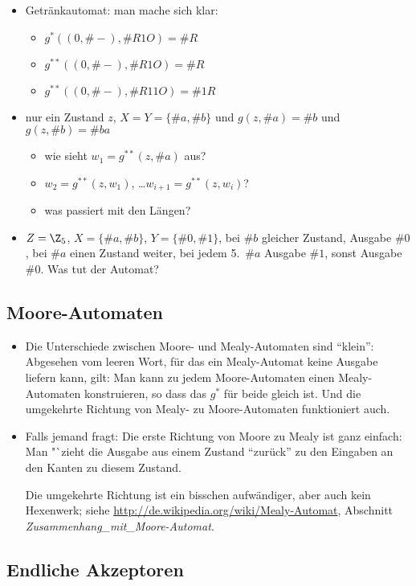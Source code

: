 \documentclass[12pt]{article}
\theoremstyle{margin}
\theoremstyle{margin}
\begin{document}
  \begin{itemize}
  \item Getränkautomat: man mache sich klar:
    \begin{itemize}
    \item $g^*((0,\#-), \#{R1O})= \#R$
    \item $g^{**}((0,\#-), \#{R1O})= \#R$
    \item $g^{**}((0,\#-), \#{R11O})= \#{1R}$
    \end{itemize}
  \item nur ein Zustand $z$, $X=Y=\{\#a,\#b\}$
    und $g(z,\#a)=\#{b}$ und $g(z,\#b)=\#{ba}$
    \begin{itemize}
    \item wie sieht $w_1=g^{**}(z,\#a)$ aus?
    \item $w_2=g^{**}(z,w_1)$, \dots $w_{i+1}=g^{**}(z,w_i)$?
    \item was passiert mit den Längen?
    \end{itemize}
  \item $Z=\Z_5$, $X=\{\#a,\#b\}$, $Y=\{\#0,\#1\}$, bei $\#b$ gleicher
    Zustand, Ausgabe $\#0$, bei $\#a$ einen Zustand weiter, bei jedem
    5.~$\#a$ Ausgabe $\#1$, sonst Ausgabe $\#0$. Was tut der Automat?
  \end{itemize}
\subsection{Moore-Automaten}
  \begin{itemize}
  \item Die Unterschiede zwischen Moore- und Mealy-Automaten sind
    "`klein"': Abgesehen vom leeren Wort, für das ein Mealy-Automat
    keine Ausgabe liefern kann, gilt: Man kann zu jedem
    Moore-Automaten einen Mealy-Automaten konstruieren, so dass das
    $g^*$ für beide gleich ist. Und die umgekehrte Richtung von Mealy-
    zu Moore-Automaten funktioniert auch.

  \item Falls jemand fragt: Die erste Richtung von Moore zu Mealy ist
    ganz einfach: Man "`zieht die Ausgabe aus einem Zustand "`zurück"'
    zu den Eingaben an den Kanten zu diesem Zustand.

    Die umgekehrte Richtung ist ein bisschen aufwändiger, aber auch
    kein Hexenwerk; siehe
    \url{http://de.wikipedia.org/wiki/Mealy-Automat}, Abschnitt
    \emph{Zusammenhang\_mit\_Moore-Automat}.
  \end{itemize}
\subsection{Endliche Akzeptoren}
\end{document}
